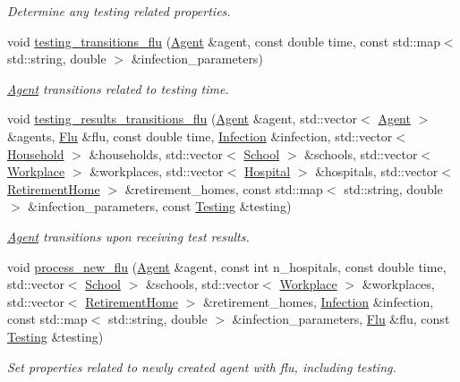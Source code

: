 \begin{DoxyCompactItemize}
\begin{DoxyCompactList}\small\item\em Determine any testing related properties. \end{DoxyCompactList}\item 
void \hyperlink{classFluTransitions_ab534b1ee19eaabccef0901ce5bef718f}{testing\+\_\+transitions\+\_\+flu} (\hyperlink{classAgent}{Agent} \&agent, const double time, const std\+::map$<$ std\+::string, double $>$ \&infection\+\_\+parameters)
\begin{DoxyCompactList}\small\item\em \hyperlink{classAgent}{Agent} transitions related to testing time. \end{DoxyCompactList}\item 
void \hyperlink{classFluTransitions_ac6ab415922b627b54090216237c5c79e}{testing\+\_\+results\+\_\+transitions\+\_\+flu} (\hyperlink{classAgent}{Agent} \&agent, std\+::vector$<$ \hyperlink{classAgent}{Agent} $>$ \&agents, \hyperlink{classFlu}{Flu} \&flu, const double time, \hyperlink{classInfection}{Infection} \&infection, std\+::vector$<$ \hyperlink{classHousehold}{Household} $>$ \&households, std\+::vector$<$ \hyperlink{classSchool}{School} $>$ \&schools, std\+::vector$<$ \hyperlink{classWorkplace}{Workplace} $>$ \&workplaces, std\+::vector$<$ \hyperlink{classHospital}{Hospital} $>$ \&hospitals, std\+::vector$<$ \hyperlink{classRetirementHome}{Retirement\+Home} $>$ \&retirement\+\_\+homes, const std\+::map$<$ std\+::string, double $>$ \&infection\+\_\+parameters, const \hyperlink{classTesting}{Testing} \&testing)
\begin{DoxyCompactList}\small\item\em \hyperlink{classAgent}{Agent} transitions upon receiving test results. \end{DoxyCompactList}\item 
void \hyperlink{classFluTransitions_a7e2dec45f840a123bb4418e276674531}{process\+\_\+new\+\_\+flu} (\hyperlink{classAgent}{Agent} \&agent, const int n\+\_\+hospitals, const double time, std\+::vector$<$ \hyperlink{classSchool}{School} $>$ \&schools, std\+::vector$<$ \hyperlink{classWorkplace}{Workplace} $>$ \&workplaces, std\+::vector$<$ \hyperlink{classRetirementHome}{Retirement\+Home} $>$ \&retirement\+\_\+homes, \hyperlink{classInfection}{Infection} \&infection, const std\+::map$<$ std\+::string, double $>$ \&infection\+\_\+parameters, \hyperlink{classFlu}{Flu} \&flu, const \hyperlink{classTesting}{Testing} \&testing)
\begin{DoxyCompactList}\small\item\em Set properties related to newly created agent with flu, including testing. \end{DoxyCompactList}\end{DoxyCompactItemize}


